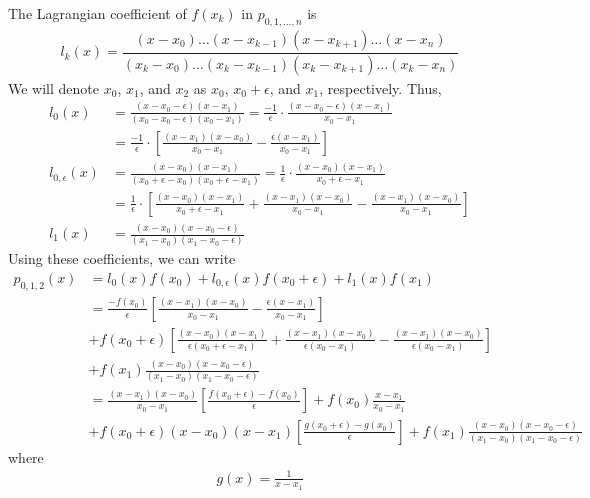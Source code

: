 \documentclass[12pt]{article}
\begin{document}
\noindent The Lagrangian coefficient of $f(x_k)$ in $p_{0, 1, \dots, n}$ is
\begin{align*}
l_k(x) = \dfrac{(x-x_0)\dots(x-x_{k-1})(x-x_{k+1})\dots(x-x_n)}{(x_k-x_0)\dots(x_k-x_{k-1})(x_k-x_{k+1})\dots(x_k-x_n)}
\end{align*}
We will denote $x_0$, $x_1$, and $x_2$ as $x_0$, $x_0 + \epsilon$, and $x_1$, respectively.  Thus,
\begin{align*}
l_0(x) &= \frac{(x - x_0 - \epsilon)(x - x_1)}{(x_0 - x_0 - \epsilon)(x_0 - x_1)} = \frac{-1}{\epsilon}\cdot\frac{(x - x_0 - \epsilon)(x - x_1)}{x_0 - x_1} \\[.1cm]
&= \frac{-1}{\epsilon}\cdot\left[\frac{(x - x_1)(x - x_0)}{x_0 - x_1} - \frac{\epsilon(x - x_1)}{x_0 - x_1}\right] \\[.1cm]
l_{0, \epsilon}(x) &= \frac{(x - x_0)(x - x_1)}{(x_0 + \epsilon - x_0)(x_0 + \epsilon - x_1)} = \frac{1}{\epsilon}\cdot\frac{(x - x_0)(x - x_1)}{x_0 + \epsilon - x_1} \\[.1cm]
&= \frac{1}{\epsilon}\cdot\left[\frac{(x - x_0)(x - x_1)}{x_0 + \epsilon - x_1} + \frac{(x - x_1)(x - x_0)}{x_0 - x_1} - \frac{(x - x_1)(x - x_0)}{x_0 - x_1}\right] \\[.1cm]
l_1(x) &= \frac{(x - x_0)(x - x_0 - \epsilon)}{(x_1 - x_0)(x_1 - x_0 - \epsilon)}
\end{align*}
Using these coefficients, we can write
\begin{align*}
p_{0, 1, 2}(x) &= l_0(x)f(x_0) + l_{0, \epsilon}(x)f(x_0 + \epsilon) + l_1(x)f(x_1) \\[.1cm]
&= \frac{-f(x_0)}{\epsilon}\left[\frac{(x - x_1)(x - x_0)}{x_0 - x_1} - \frac{\epsilon(x - x_1)}{x_0 - x_1}\right] \\[.1cm]
&+f(x_0 + \epsilon)\left[\frac{(x - x_0)(x - x_1)}{\epsilon(x_0 + \epsilon - x_1)} + \frac{(x - x_1)(x - x_0)}{\epsilon(x_0 - x_1)} - \frac{(x - x_1)(x - x_0)}{\epsilon(x_0 - x_1)}\right] \\[.1cm]
&+f(x_1)\frac{(x - x_0)(x - x_0 - \epsilon)}{(x_1 - x_0)(x_1 - x_0 - \epsilon)} \\[.1cm]
&= \frac{(x - x_1)(x - x_0)}{x_0 - x_1}\left[\frac{f(x_0 + \epsilon) - f(x_0)}{\epsilon}\right] + f(x_0)\frac{x - x_1}{x_0 - x_1} \\[.1cm]
&+ f(x_0 + \epsilon)(x - x_0)(x - x_1)\left[\frac{g(x_0 + \epsilon) - g(x_0)}{\epsilon}\right] + f(x_1)\frac{(x - x_0)(x - x_0 - \epsilon)}{(x_1 - x_0)(x_1 - x_0 - \epsilon)}
\end{align*}
where
\begin{align*}
g(x) = \frac{1}{x - x_1}
\end{align*}
\end{document}
